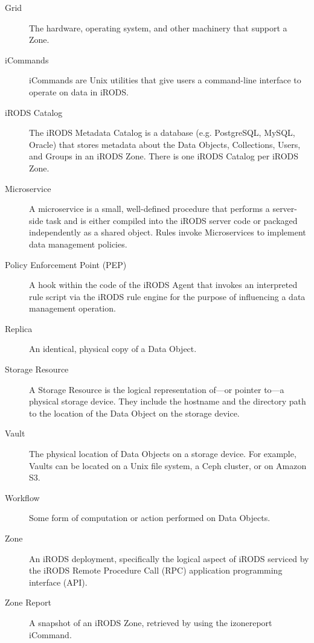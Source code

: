 \documentclass[10pt,oneside]{memoir}
\begin{document}
\begin{description}
\item [Grid]
The hardware, operating system, and other machinery that support a Zone.

\item [iCommands]
iCommands are Unix utilities that give users a command-line interface to operate on data in iRODS.

\item [iRODS Catalog]
The iRODS Metadata Catalog is a database (e.g. PostgreSQL, MySQL, Oracle) that stores metadata about the Data Objects, Collections, Users, and Groups in an iRODS Zone. There is one iRODS Catalog per iRODS Zone.

\item [Microservice]
A microservice is a small, well-defined procedure that performs a server-side task and is either compiled into the iRODS server code or packaged independently as a shared object. Rules invoke Microservices to implement data management policies.

\item [Policy Enforcement Point (PEP)]
A hook within the code of the iRODS Agent that invokes an interpreted rule script via the iRODS rule engine for the purpose of influencing a data management operation.

\item [Replica]
An identical, physical copy of a Data Object.

\item [Storage Resource]
A Storage Resource is the logical representation of---or pointer to---a physical storage device. They include the hostname and the directory path to the location of the Data Object on the storage device.

\item [Vault]
The physical location of Data Objects on a storage device. For example, Vaults can be located on a Unix file system, a Ceph cluster, or on Amazon S3.

\item [Workflow]
Some form of computation or action performed on Data Objects.

\item [Zone]
An iRODS deployment, specifically the logical aspect of iRODS serviced by the iRODS Remote Procedure Call (RPC) application programming interface (API).

\item [Zone Report]
A snapshot of an iRODS Zone, retrieved by using the izonereport iCommand.

\end{description}
\end{document}
